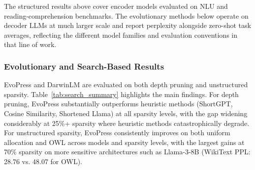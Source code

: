The structured results above cover encoder models evaluated on NLU and reading-comprehension benchmarks. The evolutionary methods below operate on decoder LLMs at much larger scale and report perplexity alongside zero-shot task averages, reflecting the different model families and evaluation conventions in that line of work.

\subsubsection{Evolutionary and Search-Based Results}

EvoPress and DarwinLM are evaluated on both depth pruning and unstructured sparsity. Table~\ref{tab:search_summary} highlights the main findings. For depth pruning, EvoPress substantially outperforms heuristic methods (ShortGPT, Cosine Similarity, Shortened Llama) at all sparsity levels, with the gap widening considerably at 25\%+ sparsity where heuristic methods catastrophically degrade. For unstructured sparsity, EvoPress consistently improves on both uniform allocation and OWL across models and sparsity levels, with the largest gains at 70\% sparsity on more sensitive architectures such as Llama-3-8B (WikiText PPL: 28.76 vs. 48.07 for OWL).

